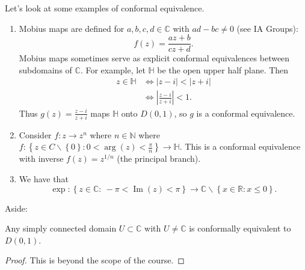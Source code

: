 \documentclass[a4paper]{scrartcl}
\begin{document}
\begin{example*}
     Let's look at some examples of conformal equivalence.
      \begin{enumerate}
           \item Mobius maps are defined for $a,b,c,d \in \mathbb{C}$ with $ad-bc \neq 0$ (see IA Groups): \[
           f (z)= \frac{az+b}{cz+d}
           .\] Mobius maps sometimes serve as explicit conformal equivalences between subdomains of $\mathbb{C}$. For example, let $\mathbb{H}$ be the open upper half plane. Then 
           \begin{align*}
                z \in \mathbb{H} &\iff |z-i| < |z+i|\\
                & \iff | \frac{z-i}{z+i}|<1.
           \end{align*}
           Thus $g (z)=\frac{z-i}{z+i}$ maps $\mathbb{H}$ onto $D (0,1)$, so $g$ is a conformal equivalence.
           \item Consider $f: z \rightarrow z^{n}$ where $n \in \mathbb{N}$ where $f: \left\{z \in C \backslash \left\{0\right\}: 0 < \operatorname{arg}(z) < \frac{\pi}{n}\right\} \rightarrow \mathbb{H}$. This is a conformal equivalence with inverse $f (z)=z^{1/n}$ (the principal branch).
           \item We have that \[
           \operatorname{exp}: \left\{z \in \mathbb{C}: \ -\pi < \operatorname{Im}(z)<\pi\right\} \rightarrow \mathbb{C} \backslash \left\{x \in \mathbb{R}: x \leq 0\right\}
           .\]  
      \end{enumerate}
\end{example*}
Aside:
\begin{theorem}
      Any simply connected domain $U \subset \mathbb{C}$ with $U \neq \mathbb{C}$ is conformally equivalent to $D (0,1)$.
\end{theorem}
\begin{proof}
      This is beyond the scope of the course.\footnotemark
\end{proof}
\end{document}
